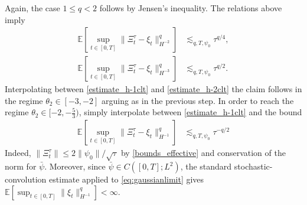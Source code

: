 \documentclass[a4paper,10pt]{amsart}
\newcommand{\expt}[1]{\mathbb{E}\left[#1\right]}
\theoremstyle{remark}
\numberwithin{equation}{section}
\begin{document}
Again, the case $1\leq q<2$ follows by Jensen's inequality.
The relations above imply
\begin{align}\label{estimate_h-1clt}
    \expt{\sup_{t\in [0,T]}\|\Xi^{\tau}_t-\xi_t \|_{H^{-2}}^q}&\lesssim_{q,T,\psi_0} \tau^{q/4},\\ 
    \expt{\sup_{t\in [0,T]}\|\Xi^{\tau}_t-\xi_t \|_{H^{-3}}^q}&\lesssim_{q,T,\psi_0} \tau^{q/2}. \label{estimate_h-2clt}
\end{align}
Interpolating between \eqref{estimate_h-1clt} and \eqref{estimate_h-2clt} the claim follows in the regime $\theta_2\in [-3,-2]$ arguing as in the previous step. In order to reach the regime $\theta_2\in [-2,-\frac{5}{3})$, simply interpolate between \eqref{estimate_h-1clt} and the bound
\begin{align*}
     \expt{\sup_{t\in [0,T]}\|\Xi^{\tau}_t-\xi_t \|_{H^{-1}}^q}&\lesssim_{q,T,\psi_0} \tau^{-q/2}
\end{align*}
Indeed, $\|\Xi^\tau_t\|\leq 2\|\psi_0\|/\sqrt{\tau}$ by
\eqref{bounds_effective} and conservation of the norm for $\bar\psi$.
Moreover, since $\bar{\psi}\in C([0,T];L^2)$, the standard stochastic-convolution
estimate applied to \eqref{eq:gaussianlimit} gives
\(\mathbb E[\sup_{t\in[0,T]}\|\xi_t\|_{H^{-1}}^q]<\infty\).
\end{document}
